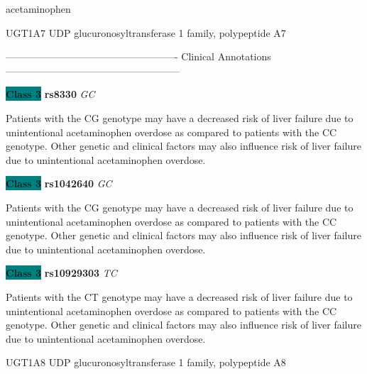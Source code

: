 \documentclass{resume} %
\begin{document}
\begin{rSection}{ acetaminophen }
\begin{rSubsection}{ UGT1A7 }{ UDP glucuronosyltransferase 1 family, polypeptide A7 }{}{}
\item[] ---------------------------------------------------- Clinical Annotations -----------------------------------------------------\newline
\item \textbf{\colorbox{teal} {Class 3}} \textbf{ rs8330 } \textit{ GC }
\item[] Patients with the CG genotype may have a decreased risk of liver failure due to unintentional acetaminophen overdose as compared to patients with the CC genotype. Other genetic and clinical factors may also influence risk of liver failure due to unintentional acetaminophen overdose.\item \textbf{\colorbox{teal} {Class 3}} \textbf{ rs1042640 } \textit{ GC }
\item[] Patients with the CG genotype may have a decreased risk of liver failure due to unintentional acetaminophen overdose as compared to patients with the CC genotype. Other genetic and clinical factors may also influence risk of liver failure due to unintentional acetaminophen overdose.\item \textbf{\colorbox{teal} {Class 3}} \textbf{ rs10929303 } \textit{ TC }
\item[] Patients with the CT genotype may have a decreased risk of liver failure due to unintentional acetaminophen overdose as compared to patients with the CC genotype. Other genetic and clinical factors may also influence risk of liver failure due to unintentional acetaminophen overdose.
\end{rSubsection}\begin{rSubsection}{ UGT1A8 }{ UDP glucuronosyltransferase 1 family, polypeptide A8 }{}{}
\item[]


\end{rSubsection}
\end{rSection}
\end{document}

